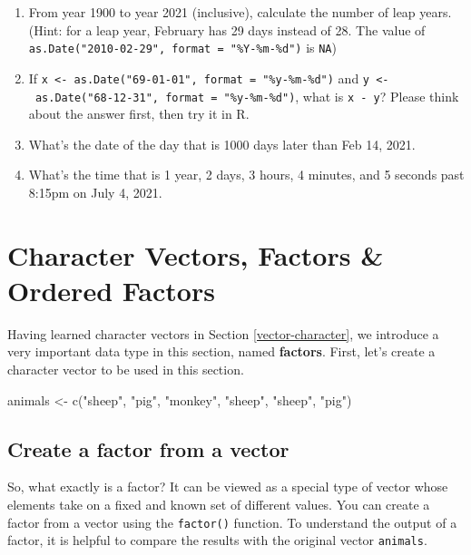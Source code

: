 \documentclass[
]{book}
\newenvironment{Shaded}{\begin{snugshade}}{\end{snugshade}}
\newcommand{\FunctionTok}[1]{\textcolor[rgb]{0.00,0.00,0.00}{#1}}
\newcommand{\NormalTok}[1]{#1}
\newcommand{\OtherTok}[1]{\textcolor[rgb]{0.56,0.35,0.01}{#1}}
\newcommand{\StringTok}[1]{\textcolor[rgb]{0.31,0.60,0.02}{#1}}
\begin{document}
\begin{enumerate}
\def\labelenumi{\arabic{enumi}.}
\item
  From year 1900 to year 2021 (inclusive), calculate the number of leap years. (Hint: for a leap year, February has 29 days instead of 28. The value of \texttt{as.Date("2010-02-29",\ format\ =\ "\%Y-\%m-\%d")} is \texttt{NA})
\item
  If \texttt{x\ \textless{}-\ as.Date("69-01-01",\ format\ =\ "\%y-\%m-\%d")} and \texttt{y\ \textless{}-\ as.Date("68-12-31",\ format\ =\ "\%y-\%m-\%d")}, what is \texttt{x\ -\ y}? Please think about the answer first, then try it in R.
\item
  What's the date of the day that is 1000 days later than Feb 14, 2021.
\item
  What's the time that is 1 year, 2 days, 3 hours, 4 minutes, and 5 seconds past 8:15pm on July 4, 2021.
\end{enumerate}

\hypertarget{factor}{%
\section{Character Vectors, Factors \& Ordered Factors}\label{factor}}

Having learned character vectors in Section \ref{vector-character}, we introduce a very important data type in this section, named \textbf{factors}. First, let's create a character vector to be used in this section.

\begin{Shaded}
\begin{Highlighting}[]
\NormalTok{animals }\OtherTok{\textless{}{-}} \FunctionTok{c}\NormalTok{(}\StringTok{"sheep"}\NormalTok{, }\StringTok{"pig"}\NormalTok{, }\StringTok{"monkey"}\NormalTok{, }\StringTok{"sheep"}\NormalTok{, }\StringTok{"sheep"}\NormalTok{, }\StringTok{"pig"}\NormalTok{)}
\end{Highlighting}
\end{Shaded}

\hypertarget{create-a-factor-from-a-vector}{%
\subsection{Create a factor from a vector}\label{create-a-factor-from-a-vector}}

So, what exactly is a factor? It can be viewed as a special type of vector whose elements take on a fixed and known set of different values. You can create a factor from a vector using the \texttt{factor()} function. To understand the output of a factor, it is helpful to
compare the results with the original vector \texttt{animals}.
\end{document}
